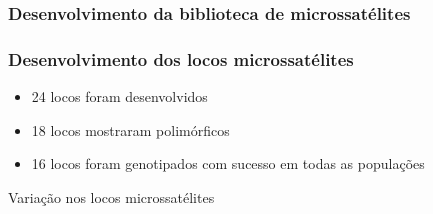 \documentclass{beamer}
\begin{document}
\begin{frame}
  \frametitle{Desenvolvimento  da biblioteca de microssatélites}

  \end{frame}

\begin{frame}
  \frametitle{Desenvolvimento dos locos microssatélites}
  \begin{itemize}[<+->]
  \item 24 locos foram desenvolvidos
  \item 18 locos mostraram polimórficos
  \item 16 locos foram genotipados com sucesso em todas as popula\c{c}ões    
    \end{itemize}
  \end{frame}

\begin{frame}{Varia\c{c}ão nos locos microssatélites}

  \begin{table}
  \begin{center}
  \caption{Caracteriza\c{c}ão dos locos microssatélites nas popula\c{c}ões de  \textit{Poecilia vivipara} amostradas.} 
\end{center}
\end{table}
  
  \end{frame}
\end{document}
